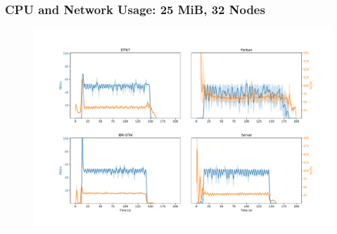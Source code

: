 \begin{frame}
  \frametitle{CPU and Network Usage: 25 MiB, 32 Nodes}

  \begin{figure}
    \includegraphics[width=\linewidth,keepaspectratio]{include/cpu-load}
  \end{figure}
\end{frame}
